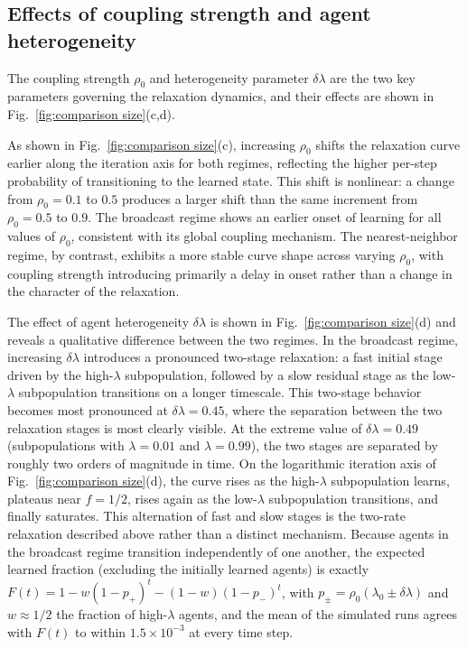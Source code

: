 \documentclass[a4paper,fleqn]{cas-sc}
\begin{document}
\subsection{Effects of coupling strength and agent heterogeneity}\label{sec:heterogeneity}

    The coupling strength $\rho_0$ and heterogeneity parameter $\delta\lambda$ are the two key parameters governing the relaxation dynamics, and their effects are shown in Fig.~\ref{fig:comparison size}(c,d).

    As shown in Fig.~\ref{fig:comparison size}(c), increasing $\rho_0$ shifts the relaxation curve earlier along the iteration axis for both regimes, reflecting the higher per-step probability of transitioning to the learned state.
    This shift is nonlinear: a change from $\rho_0=0.1$ to $0.5$ produces a larger shift than the same increment from $\rho_0=0.5$ to $0.9$.
    The broadcast regime shows an earlier onset of learning for all values of $\rho_0$, consistent with its global coupling mechanism.
    The nearest-neighbor regime, by contrast, exhibits a more stable curve shape across varying $\rho_0$, with coupling strength introducing primarily a delay in onset rather than a change in the character of the relaxation.

    The effect of agent heterogeneity $\delta\lambda$ is shown in Fig.~\ref{fig:comparison size}(d) and reveals a qualitative difference between the two regimes.
    In the broadcast regime, increasing $\delta\lambda$ introduces a pronounced two-stage relaxation: a fast initial stage driven by the high-$\lambda$ subpopulation, followed by a slow residual stage as the low-$\lambda$ subpopulation transitions on a longer timescale.
    This two-stage behavior becomes most pronounced at $\delta\lambda=0.45$, where the separation between the two relaxation stages is most clearly visible.
    At the extreme value of $\delta\lambda=0.49$ (subpopulations with $\lambda=0.01$ and $\lambda=0.99$), the two stages are separated by roughly two orders of magnitude in time.
    On the logarithmic iteration axis of Fig.~\ref{fig:comparison size}(d), the curve rises as the high-$\lambda$ subpopulation learns, plateaus near $f=1/2$, rises again as the low-$\lambda$ subpopulation transitions, and finally saturates.
    This alternation of fast and slow stages is the two-rate relaxation described above rather than a distinct mechanism.
    Because agents in the broadcast regime transition independently of one another, the expected learned fraction (excluding the initially learned agents) is exactly
    $F(t)=1-w(1-p_+)^t-(1-w)(1-p_-)^t$, with $p_\pm=\rho_0(\lambda_0\pm\delta\lambda)$ and $w\approx1/2$ the fraction of high-$\lambda$ agents, and the mean of the simulated runs agrees with $F(t)$ to within $1.5\times10^{-3}$ at every time step.
\end{document}
